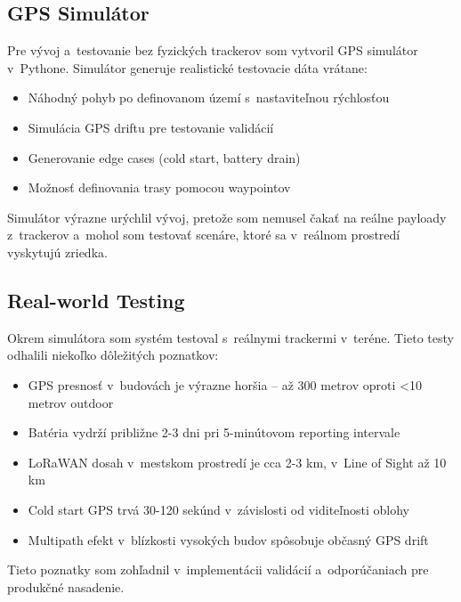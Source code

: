 \subsection{GPS Simulátor}
\label{sec:Simulator}

Pre vývoj a~testovanie bez fyzických trackerov som vytvoril GPS simulátor v~Pythone. Simulátor generuje realistické testovacie dáta vrátane:

\begin{itemize}
    \item Náhodný pohyb po definovanom území s~nastaviteľnou rýchlosťou
    \item Simulácia GPS driftu pre testovanie validácií
    \item Generovanie edge cases (cold start, battery drain)
    \item Možnosť definovania trasy pomocou waypointov
\end{itemize}

Simulátor výrazne urýchlil vývoj, pretože som nemusel čakať na reálne payloady z~trackerov a~mohol som testovať scenáre, ktoré sa v~reálnom prostredí vyskytujú zriedka.

\subsection{Real-world Testing}
\label{sec:RealTesting}

Okrem simulátora som systém testoval s~reálnymi trackermi v~teréne. Tieto testy odhalili niekoľko dôležitých poznatkov:

\begin{itemize}
    \item GPS presnosť v~budovách je výrazne horšia -- až 300 metrov oproti <10 metrov outdoor
    \item Batéria vydrží približne 2-3 dni pri 5-minútovom reporting intervale
    \item LoRaWAN dosah v~mestskom prostredí je cca 2-3 km, v~Line of Sight až 10 km
    \item Cold start GPS trvá 30-120 sekúnd v~závislosti od viditeľnosti oblohy
    \item Multipath efekt v~blízkosti vysokých budov spôsobuje občasný GPS drift
\end{itemize}

Tieto poznatky som zohľadnil v~implementácii validácií a~odporúčaniach pre produkčné nasadenie.


\endinput
